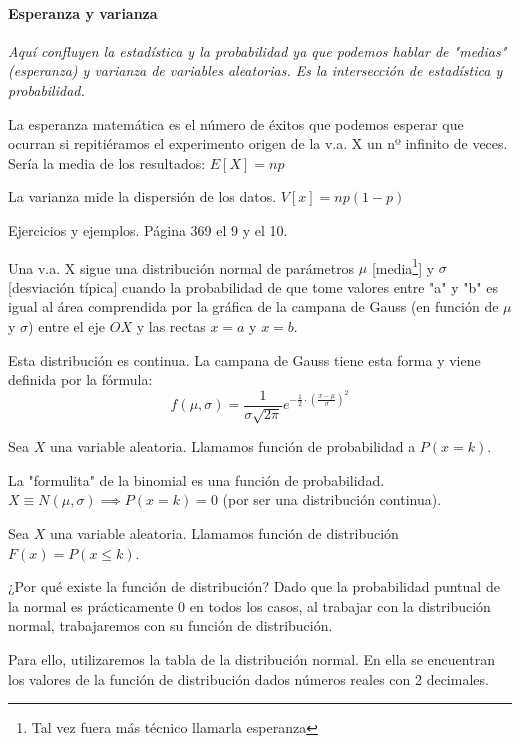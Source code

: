 \paragraph{Esperanza y varianza}
\textit{Aquí confluyen la estadística y la probabilidad ya que podemos hablar de "medias" (esperanza) y varianza de variables aleatorias. Es la intersección de estadística y probabilidad.}

La esperanza matemática es el número de éxitos que podemos esperar que ocurran si repitiéramos el experimento origen de la v.a. X un nº infinito de veces. Sería la media de los resultados: $E[X] = np$

La varianza mide la dispersión de los datos. $V[x] = np(1-p)$

Ejercicios y ejemplos. Página 369 el 9 y el 10.

\begin{defn}
Una v.a. X sigue una distribución normal de parámetros $\mu$ [media\footnote{Tal vez fuera más técnico llamarla esperanza}] y $\sigma$ [desviación típica] cuando la probabilidad de que tome valores entre "a" y "b" es igual al área comprendida por la gráfica de la campana de Gauss (en función de $\mu$ y $\sigma$) entre el eje $OX$ y las rectas $x=a$ y $x=b$.
\end{defn}

\obs Esta distribución es continua.
\obs La campana de Gauss tiene esta forma y viene definida por la fórmula: \[f(\mu,\sigma) = \displaystyle\frac{1}{\sigma\sqrt{2\pi}}e^{\displaystyle-\frac{1}{2}·\left(\frac{x-\mu}{\sigma}\right)^2}\]

\begin{defn}
Sea $X$ una variable aleatoria. Llamamos función de probabilidad a $P(x=k)$.
\end{defn}
\obs La "formulita" de la binomial es una función de probabilidad.
\obs $X\equiv N(\mu,\sigma) \implies P(x=k) = 0$ (por ser una distribución continua).

\begin{defn}
Sea $X$ una variable aleatoria. Llamamos función de distribución $F(x) = P(x\leq k)$.
\end{defn}

\obs ¿Por qué existe la función de distribución?
%
Dado que la probabilidad puntual de la normal es prácticamente 0 en todos los casos, al trabajar con la distribución normal, trabajaremos con su función de distribución.

Para ello, utilizaremos la tabla de la distribución normal. En ella se encuentran los valores de la función de distribución dados números reales con 2 decimales.

